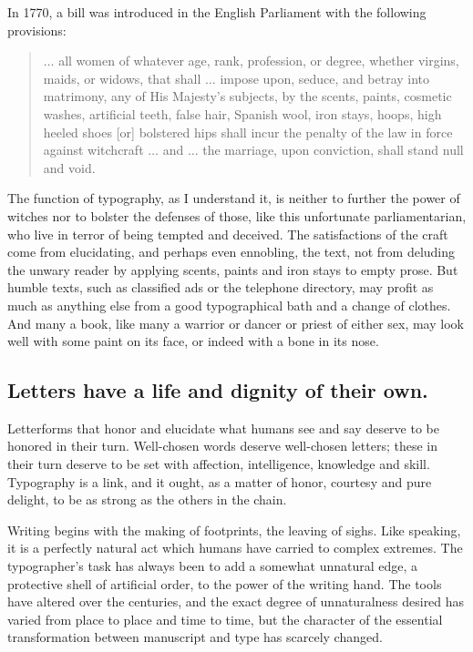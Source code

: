 In 1770, a bill was introduced in the English Parliament with the following provisions:
\begin{quote}$\ldots$ all women of whatever age, rank, profession, or degree, whether virgins, maids, or widows, that shall $\ldots$ impose upon, seduce, and betray into matrimony, any of His Majesty's subjects, by the scents, paints, cosmetic washes, artificial teeth, false hair, Spanish wool, iron stays, hoops, high heeled shoes {\rm [}or{\rm ]} bolstered hips shall incur the pen\-alty of the law in force against witchcraft $\ldots$ and $\ldots$ the marriage, upon conviction, shall stand null and void.
\end{quote}
The function of typography, as I understand it, is neither to further the power of witches nor to bolster the defenses of those, like this unfortunate parliamentarian, who live in terror of being tempted and deceived. The satisfactions of the craft come from elucidating, and perhaps even ennobling, the text, not from deluding the unwary reader by applying scents, paints and iron stays to empty prose. But humble texts, such as classified ads or the telephone directory, may profit as much as anything else from a good typographical bath and a change of clothes. And many a book, like many a warrior or dancer or priest of either sex, may look well with some paint on its face, or indeed with a bone in its nose.

\subsection{Letters have a life and dignity of their own.}

Letterforms that honor and elucidate what humans see and say deserve to be honored in their turn. Well-chosen words deserve well-chosen letters; these in their turn deserve to be set with affection, intelligence, knowledge and skill. Typography is a link, and it ought, as a matter of honor, courtesy and pure delight, to be as strong as the others in the chain.

Writing begins with the making of footprints, the leaving of sighs. Like speaking, it is a perfectly natural act which humans have carried to complex extremes. The typographer's task has always been to add a somewhat unnatural edge, a protective shell of artificial order, to the power of the writing hand. The tools have altered over the centuries, and the exact degree of unnaturalness desired has varied from place to place and time to time, but the character of the essential transformation between manuscript and type has scarcely changed.

